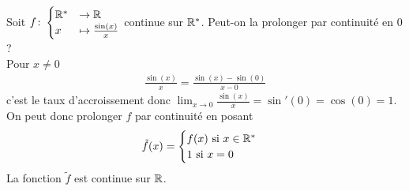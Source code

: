 \begin{exemple}
Soit 
$
f \colon 
\begin{cases}
\mathbb{R}^* &\to \mathbb{R} \\
x &\mapsto \frac{\sin(x)}{x}
\end{cases}
$
continue sur $\mathbb{R}^*$. Peut-on la prolonger par continuité en $0$ ?
\\
Pour $x \neq 0$
\begin{align*}
\frac{\sin (x)}{x} = \frac{\sin (x) - \sin (0)}{x - 0}
\end{align*}
c'est le taux d'accroissement donc $\lim_{x \to 0} \frac{\sin (x)}{x} = \sin' (0) = \cos (0) = 1$.
On peut donc prolonger $f$ par continuité en posant
\begin{align*}
\tilde{f}(x) =
\begin{cases}
f(x) \text{ si } x \in \mathbb{R}^* \\
1 \text{ si } x = 0
\end{cases} 
\end{align*}
La fonction $\tilde{f}$ est continue sur $\mathbb{R}$.
\end{exemple}
